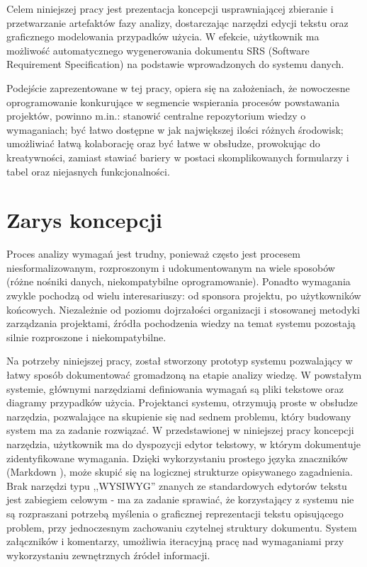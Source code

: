       Celem niniejszej pracy jest prezentacja koncepcji usprawniającej zbieranie i przetwarzanie artefaktów fazy analizy, dostarczając narzędzi edycji tekstu oraz graficznego modelowania przypadków użycia. W efekcie, użytkownik ma możliwość automatycznego wygenerowania dokumentu SRS (Software Requirement Specification) \cite{IEEE89} na podstawie wprowadzonych do systemu danych.
      
      Podejście zaprezentowane w tej pracy, opiera się na założeniach, że nowoczesne oprogramowanie konkurujące w segmencie wspierania procesów powstawania projektów, powinno m.in.: stanowić centralne repozytorium wiedzy o wymaganiach; być łatwo dostępne w jak największej ilości różnych środowisk; umożliwiać łatwą kolaborację oraz być łatwe w obsłudze, prowokując do kreatywności, zamiast stawiać bariery w postaci skomplikowanych formularzy i tabel oraz niejasnych funkcjonalności. 


    \section{Zarys koncepcji}

      Proces analizy wymagań jest trudny, ponieważ często jest procesem niesformalizowanym, rozproszonym i udokumentowanym na wiele sposobów (różne nośniki danych, niekompatybilne oprogramowanie). Ponadto wymagania zwykle pochodzą od wielu interesariuszy: od sponsora projektu, po użytkowników końcowych. Niezależnie od poziomu dojrzałości organizacji i stosowanej metodyki zarządzania projektami, źródła pochodzenia wiedzy na temat systemu pozostają silnie rozproszone i niekompatybilne. 

      Na potrzeby niniejszej pracy, został stworzony prototyp systemu pozwalający w łatwy sposób dokumentować gromadzoną na etapie analizy wiedzę. W powstałym systemie, głównymi narzędziami definiowania wymagań są pliki tekstowe oraz diagramy przypadków użycia. Projektanci systemu, otrzymują proste w obsłudze narzędzia, pozwalające na skupienie się nad sednem problemu, który budowany system ma za zadanie rozwiązać. W przedstawionej w niniejszej pracy koncepcji narzędzia, użytkownik ma do dyspozycji edytor tekstowy, w którym dokumentuje zidentyfikowane wymagania. Dzięki wykorzystaniu prostego języka znaczników (Markdown \cite{Grub04}), może skupić się na logicznej strukturze opisywanego zagadnienia. Brak narzędzi typu ,,WYSIWYG'' znanych ze standardowych edytorów tekstu jest zabiegiem celowym - ma za zadanie sprawiać, że korzystający z systemu nie są rozpraszani potrzebą myślenia o graficznej reprezentacji tekstu opisującego problem, przy jednoczesnym zachowaniu czytelnej struktury dokumentu. System załączników i komentarzy, umożliwia iteracyjną pracę nad wymaganiami przy wykorzystaniu zewnętrznych źródeł informacji. 


